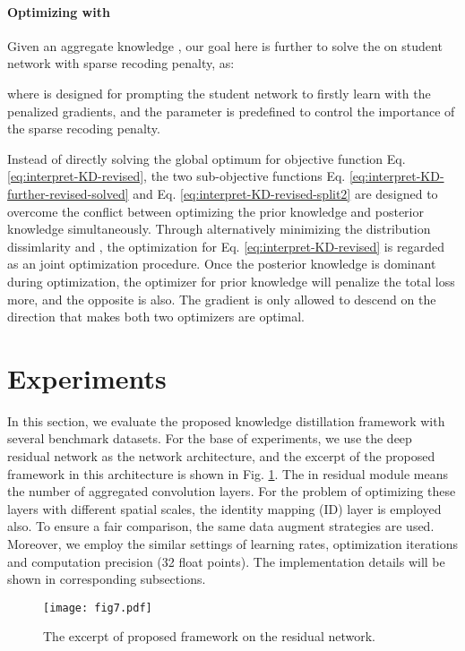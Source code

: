 \documentclass[10pt,twocolumn,letterpaper]{article}
\begin{document}
\paragraph{Optimizing  with }
Given an aggregate knowledge ,
our goal here is further to solve the  on student network with sparse recoding penalty,
as:


where  is designed for
prompting the student network to firstly learn with the penalized gradients,
and the parameter  is predefined to control
the importance of the sparse recoding penalty.

Instead of directly solving the global optimum
for objective function Eq. \ref{eq:interpret-KD-revised},
the two sub-objective functions
Eq. \ref{eq:interpret-KD-further-revised-solved}
and Eq. \ref{eq:interpret-KD-revised-split2}
are designed to
overcome the conflict between
optimizing the prior knowledge and posterior knowledge simultaneously.
Through alternatively minimizing the
distribution dissimlarity 
and ,
the optimization for Eq. \ref{eq:interpret-KD-revised} is regarded as
an joint optimization procedure.
Once the posterior knowledge is dominant during optimization,
the optimizer for prior knowledge will penalize the total loss more,
and the opposite is also.
The gradient is only allowed to descend
on the direction that makes both two optimizers are optimal.

\section{Experiments}
In this section,
we evaluate the proposed knowledge distillation framework with several benchmark datasets.
For the base of experiments,
we use the deep residual network \cite{he2016deep}
as the network architecture,
and the excerpt of the proposed framework in this architecture
is shown in Fig. \ref{fig:residual_module}.
The  in residual module means the number of aggregated convolution layers.
For the problem of optimizing these layers with different spatial scales,
the identity mapping (ID) layer \cite{Yu2018Learning} is employed also.
To ensure a fair comparison,
the same data augment strategies are used.
Moreover,
we employ the similar settings of learning rates,
optimization iterations and
computation precision (32 float points).
The implementation details
will be shown in corresponding subsections.

\begin{figure}[htb]
  \centering
  \texttt{[image: fig7.pdf]}
  \caption{The excerpt of proposed framework on the residual network.}
  \label{fig:residual_module}
\end{figure}
\end{document}
